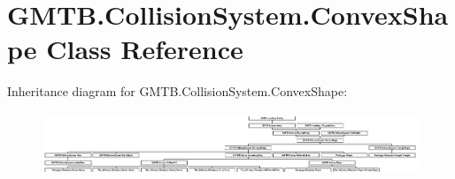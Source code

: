 \hypertarget{class_g_m_t_b_1_1_collision_system_1_1_convex_shape}{}\section{G\+M\+T\+B.\+Collision\+System.\+Convex\+Shape Class Reference}
\label{class_g_m_t_b_1_1_collision_system_1_1_convex_shape}
Inheritance diagram for G\+M\+T\+B.\+Collision\+System.\+Convex\+Shape\+:\begin{figure}[H]
\begin{center}
\leavevmode
\includegraphics[height=1.885522cm]{class_g_m_t_b_1_1_collision_system_1_1_convex_shape}
\end{center}
\end{figure}
